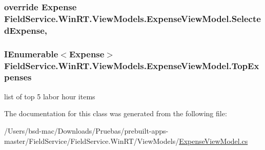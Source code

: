 \hypertarget{class_field_service_1_1_win_r_t_1_1_view_models_1_1_expense_view_model_a8afd09433c89eeb7d5f2e9d59d474647}{
\subsubsection[{Selected\+Expense}]{\setlength{\rightskip}{0pt plus 5cm}override {\bf Expense} Field\+Service.\+Win\+R\+T.\+View\+Models.\+Expense\+View\+Model.\+Selected\+Expense\hspace{0.3cm}{\ttfamily [get]}, {\ttfamily [set]}}}\label{class_field_service_1_1_win_r_t_1_1_view_models_1_1_expense_view_model_a8afd09433c89eeb7d5f2e9d59d474647}
\hypertarget{class_field_service_1_1_win_r_t_1_1_view_models_1_1_expense_view_model_a5dd8925c60ea704bcf6b8888b9ec8961}{
\subsubsection[{Top\+Expenses}]{\setlength{\rightskip}{0pt plus 5cm}I\+Enumerable$<${\bf Expense}$>$ Field\+Service.\+Win\+R\+T.\+View\+Models.\+Expense\+View\+Model.\+Top\+Expenses\hspace{0.3cm}{\ttfamily [get]}}}\label{class_field_service_1_1_win_r_t_1_1_view_models_1_1_expense_view_model_a5dd8925c60ea704bcf6b8888b9ec8961}


list of top 5 labor hour items 



The documentation for this class was generated from the following file\+:\begin{DoxyCompactItemize}
\item 
/\+Users/bsd-\/mac/\+Downloads/\+Pruebas/prebuilt-\/apps-\/master/\+Field\+Service/\+Field\+Service.\+Win\+R\+T/\+View\+Models/\hyperlink{_win_r_t_2_view_models_2_expense_view_model_8cs}{Expense\+View\+Model.\+cs}\end{DoxyCompactItemize}
